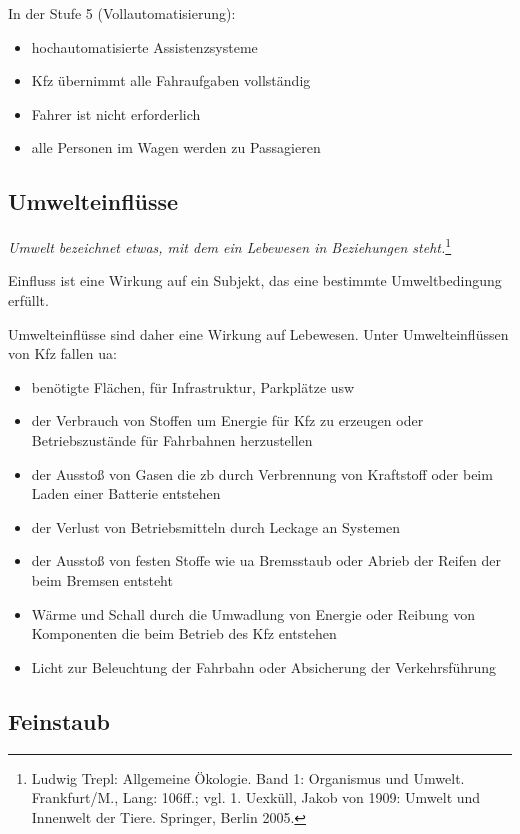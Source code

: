 In der Stufe 5 (Vollautomatisierung):
\begin{itemize}
	\item hochautomatisierte Assistenzsysteme
	\item \ac{Kfz} übernimmt alle Fahraufgaben vollständig
	\item Fahrer ist nicht erforderlich
	\item alle Personen im Wagen werden zu Passagieren
\end{itemize}


\subsection{Umwelteinflüsse}

\textit{Umwelt bezeichnet etwas, mit dem ein Lebewesen in Beziehungen steht.}\footnote{Ludwig Trepl: Allgemeine Ökologie. Band 1: Organismus und Umwelt. Frankfurt/M., Lang: 106ff.; vgl. 1. Uexküll, Jakob von 1909: Umwelt und Innenwelt der Tiere. Springer, Berlin 2005.}

Einfluss ist eine Wirkung auf ein Subjekt, das eine bestimmte Umweltbedingung erfüllt.

Umwelteinflüsse sind daher eine Wirkung auf Lebewesen.
\newline
\newline
Unter Umwelteinflüssen von \ac{Kfz} fallen \ac{ua}:
\begin{itemize}
	\item benötigte Flächen, für Infrastruktur, Parkplätze \ac{usw}
	\item der Verbrauch von Stoffen um Energie für \ac{Kfz} zu erzeugen oder Betriebszustände für Fahrbahnen herzustellen
	\item der Ausstoß von Gasen die \ac{zb} durch Verbrennung von Kraftstoff oder beim Laden einer Batterie entstehen
	\item der Verlust von Betriebsmitteln durch Leckage an Systemen
	\item der Ausstoß von festen Stoffe wie \ac{ua} Bremsstaub oder Abrieb der Reifen der beim Bremsen entsteht
	\item Wärme und Schall durch die Umwadlung von Energie oder Reibung von Komponenten die beim Betrieb des \ac{Kfz} entstehen
	\item Licht zur Beleuchtung der Fahrbahn oder Absicherung der Verkehrsführung
\end{itemize}


\subsection{Feinstaub}


